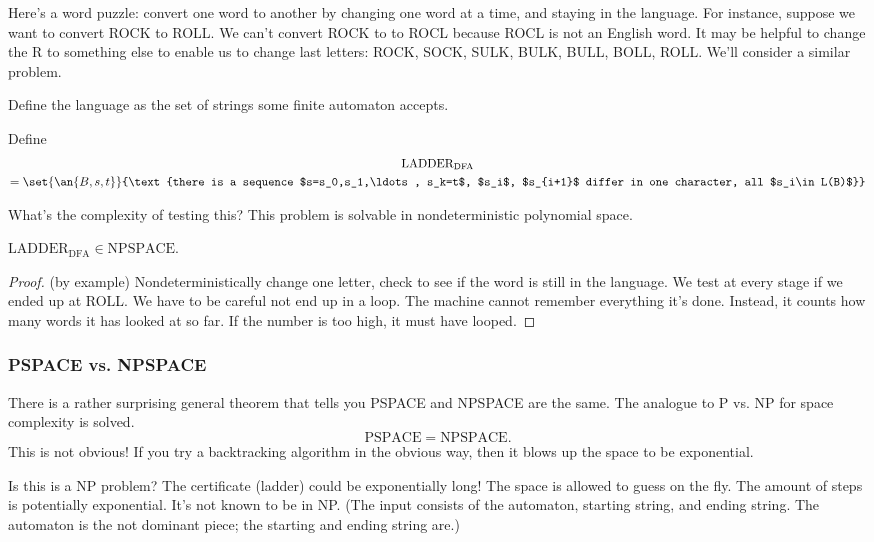 Here's a word puzzle: convert one word to another by changing one word at a time, and staying in the language. 
For instance, suppose we want to convert ROCK to ROLL. We can't convert ROCK to to ROCL because ROCL is not an English word. It may be helpful to change the R to something else to enable us to change last letters: ROCK, SOCK, SULK, BULK, BULL, BOLL, ROLL. %
We'll consider a similar problem. %

Define the language as the set of strings some finite automaton accepts.
\begin{df}
Define
\begin{multline*}
\text{LADDER}_{\text{DFA}}\\
=\set{\an{B,s,t}}{\text{there is a sequence $s=s_0,s_1,\ldots, s_k=t$, $s_i$, $s_{i+1}$ differ in one character, all $s_i\in L(B)$}}
\end{multline*}
\end{df} 
What's the complexity of testing this? This problem is solvable in nondeterministic polynomial space.
\begin{thm}
$\text{LADDER}_{\text{DFA}}\in \text{NPSPACE}$.
\end{thm}
\begin{proof}
(by example) 
Nondeterministically change one letter, check to see if the word is still in the language. We test at every stage if we ended up at ROLL. We have to be careful not end up in a loop. The machine cannot remember everything it's done. Instead, it counts how many words it has looked at so far. If the number is too high, it must have looped.
\end{proof}
\subsubsection{PSPACE vs. NPSPACE}
There is a rather surprising general theorem that tells you PSPACE and NPSPACE are the same. The analogue to P vs. NP for space complexity is solved.
\[
\text{PSPACE}=\text{NPSPACE}.
\]
This is not obvious! If you try a backtracking algorithm in the obvious way, then it blows up the space to be exponential.

Is this is a NP problem? The certificate (ladder) could be exponentially long! The space is allowed to guess on the fly. The amount of steps is potentially exponential. It's not known to be in NP. (The input consists of the automaton, starting string, and ending string. The automaton is the not dominant piece; the starting and ending string are.)

